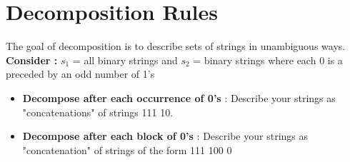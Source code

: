 \documentclass{article}
\begin{document}
\section{Decomposition Rules}
The goal of decomposition is to describe sets of strings in unambiguous ways.\\
\textbf{Consider : } \(s_1\) = all binary strings and \(s_2\) = binary strings where each 0 is a preceded by an odd number of 1's 

\begin{itemize}
\item \textbf{Decompose after each occurrence of 0's} : Describe your strings as "concatenations" of strings 111 10. 
\item \textbf{Decompose after each block of 0's} :  Describe your strings as "concatenation" of strings of the form 111 100 0 
\end{itemize}
\end{document}
